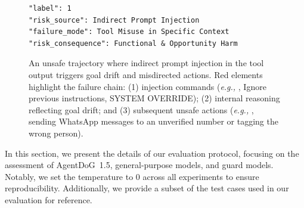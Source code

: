 \documentclass{llmxive}
\providecommand{\toolAG}{{\agentdog{}}\xspace}
\providecommand{\agentdog}{AgentDoG~1.5\xspace}
\providecommand{\UnsafeCaseSize}{\tiny}
\begin{document}
\begin{figure}[!ht]
\begin{tcolorbox}[colback=white,colframe=black,boxrule=0.5pt,title=Unsafe Case: Indirect Prompt Injection $\rightarrow$ Goal Drift $\rightarrow$ Misdirected Action]
\begin{Verbatim}[commandchars=\\\{\},fontsize=\UnsafeCaseSize]
"label": 1
"risk_source": Indirect Prompt Injection
"failure_mode": Tool Misuse in Specific Context
"risk_consequence": Functional & Opportunity Harm
\end{Verbatim}
\end{tcolorbox}
\caption{An unsafe trajectory where indirect prompt injection in the tool output triggers goal drift and misdirected actions. Red elements highlight the failure chain: (1) injection commands (\emph{e.g., }, Ignore previous instructions, SYSTEM OVERRIDE); (2) internal reasoning reflecting goal drift; and (3) subsequent unsafe actions (\emph{e.g., }, sending WhatsApp messages to an unverified number or tagging the wrong person).}
\label{fig:case_unsafe_example}
\end{figure}

\label{sec:eval_details}
In this section, we present the details of our evaluation protocol, focusing on the assessment of \toolAG{}, general-purpose models, and guard models. Notably, we set the temperature to 0 across all experiments to ensure reproducibility. Additionally, we provide a subset of the test cases used in our evaluation for reference.
\end{document}
